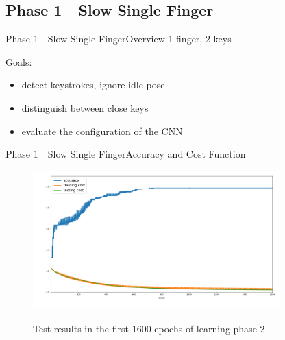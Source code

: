 \subsection{Phase 1~\textendash{}~Slow Single Finger}
\begin{frame}[fragile]{Phase 1~\textendash{}~Slow Single Finger}{Overview}
    1 finger, 2 keys

    \pause
    \vspace{2em}
    Goals:
    \begin{itemize}
        \item detect keystrokes, ignore idle pose
        \item distinguish between close keys
        \item evaluate the configuration of the CNN
    \end{itemize}

\end{frame}

\begin{frame}[fragile]{Phase 1~\textendash{}~Slow Single Finger}{Accuracy and Cost Function}
        \begin{figure}
            \includegraphics[width=0.85\textwidth]{../common/images/phase-1}
            \label{fig:phase11}
            \caption{Test results in the first $1 600$ epochs of learning phase 2}
        \end{figure}
\end{frame}

